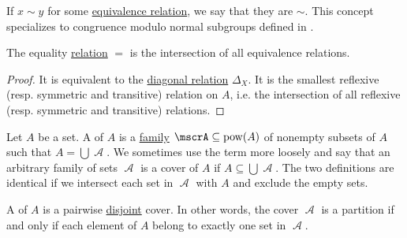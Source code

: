 \begin{remark}\label{rem:congruence_modulo_relation}
  If \( x \sim y \) for some \hyperref[def:equivalence_relation]{equivalence relation}, we say that they are  \( \sim \). This concept specializes to congruence modulo normal subgroups defined in .
\end{remark}

\begin{proposition}\label{thm:equality_is_smallest_equivalence_relation}
  The equality \hyperref[def:binary_relation]{relation} \( = \) is the intersection of all equivalence relations.
\end{proposition}
\begin{proof}
  It is equivalent to the \hyperref[def:binary_relation/diagonal]{diagonal relation} \( \Delta_X \). It is the smallest reflexive (resp. symmetric and transitive) relation on \( A \), i.e. the intersection of all reflexive (resp. symmetric and transitive) relations.
\end{proof}

\begin{definition}\label{def:set_partition}
  Let \( A \) be a set. A  of \( A \) is a \hyperref[rem:family_of_sets]{family} \( \mscrA \subseteq \pow(A) \) of nonempty subsets of \( A \) such that \( A = \bigcup \mscrA \). We sometimes use the term more loosely and say that an arbitrary family of sets \( \mscrA \) is a cover of \( A \) if \( A \subseteq \bigcup \mscrA \). The two definitions are identical if we intersect each set in \( \mscrA \) with \( A \) and exclude the empty sets.

  A  of \( A \) is a pairwise \hyperref[def:subset]{disjoint} cover. In other words, the cover \( \mscrA \) is a partition if and only if each element of \( A \) belong to exactly one set in \( \mscrA \).
\end{definition}

